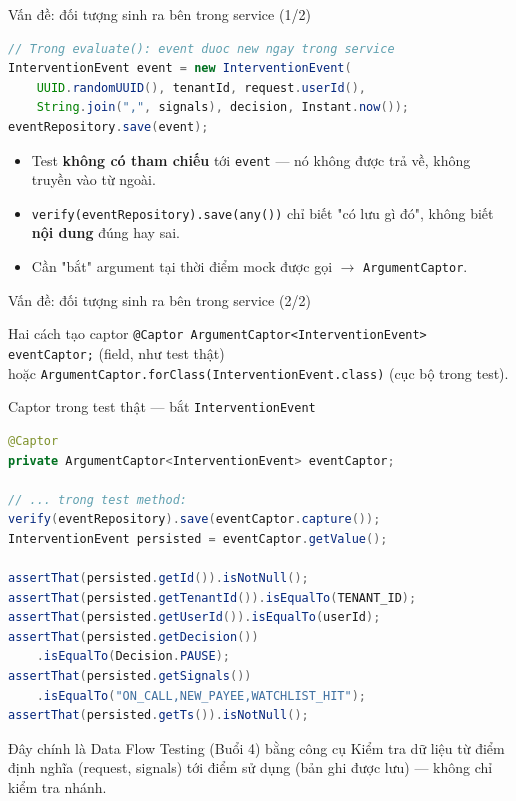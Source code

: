 \documentclass[aspectratio=169,12pt]{beamer}
\begin{document}
\begin{frame}[fragile]{Vấn đề: đối tượng sinh ra bên trong service (1/2)}
\begin{lstlisting}[language=java,basicstyle=\ttfamily\scriptsize]
// Trong evaluate(): event duoc new ngay trong service
InterventionEvent event = new InterventionEvent(
    UUID.randomUUID(), tenantId, request.userId(),
    String.join(",", signals), decision, Instant.now());
eventRepository.save(event);
\end{lstlisting}

  \begin{itemize}
    \item Test \textbf{không có tham chiếu} tới \texttt{event} --- nó không được
      trả về, không truyền vào từ ngoài.
    \item \texttt{verify(eventRepository).save(any())} chỉ biết "có lưu gì đó",
      không biết \textbf{nội dung} đúng hay sai.
    \item Cần "bắt" argument tại thời điểm mock được gọi $\to$
      \texttt{ArgumentCaptor}.
  \end{itemize}
\end{frame}

\begin{frame}{Vấn đề: đối tượng sinh ra bên trong service (2/2)}
  \begin{block}{Hai cách tạo captor}
    \texttt{@Captor ArgumentCaptor<InterventionEvent> eventCaptor;} (field, như test thật)\\
    hoặc \texttt{ArgumentCaptor.forClass(InterventionEvent.class)} (cục bộ trong test).
  \end{block}
\end{frame}

\begin{frame}[fragile]{Captor trong test thật --- bắt \texttt{InterventionEvent}}
\begin{lstlisting}[language=java,basicstyle=\ttfamily\scriptsize]
@Captor
private ArgumentCaptor<InterventionEvent> eventCaptor;

// ... trong test method:
verify(eventRepository).save(eventCaptor.capture());
InterventionEvent persisted = eventCaptor.getValue();

assertThat(persisted.getId()).isNotNull();
assertThat(persisted.getTenantId()).isEqualTo(TENANT_ID);
assertThat(persisted.getUserId()).isEqualTo(userId);
assertThat(persisted.getDecision())
    .isEqualTo(Decision.PAUSE);
assertThat(persisted.getSignals())
    .isEqualTo("ON_CALL,NEW_PAYEE,WATCHLIST_HIT");
assertThat(persisted.getTs()).isNotNull();
\end{lstlisting}

  \begin{exampleblock}{Đây chính là Data Flow Testing (Buổi 4) bằng công cụ}
    Kiểm tra dữ liệu từ điểm định nghĩa (request, signals) tới điểm sử dụng
    (bản ghi được lưu) --- không chỉ kiểm tra nhánh.
  \end{exampleblock}
\end{frame}
\end{document}
